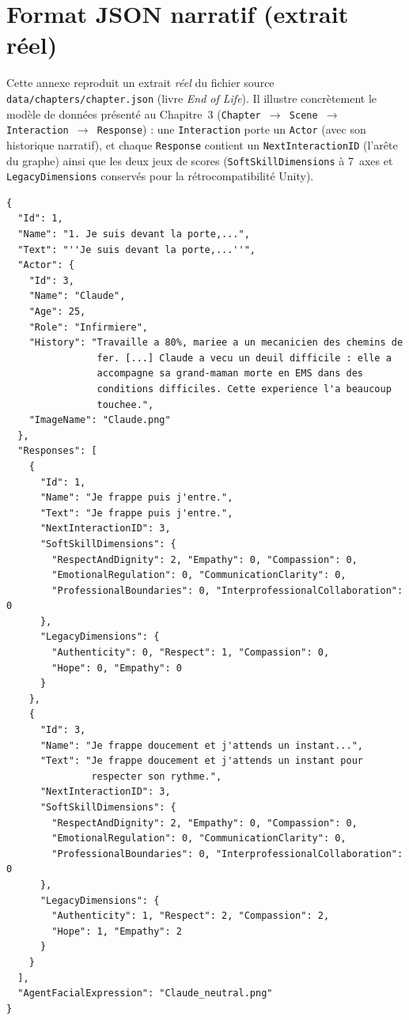 \chapter{Format JSON narratif (extrait réel)}
\label{annexe:json}
\renewcommand{\thepage}{\thechapter-\arabic{page}}

Cette annexe reproduit un extrait \emph{réel} du fichier source
\texttt{data/chapters/chapter.json} (livre \emph{End of Life}). Il illustre
concrètement le modèle de données présenté au Chapitre~3
(\texttt{Chapter $\rightarrow$ Scene $\rightarrow$ Interaction $\rightarrow$
Response}) : une \texttt{Interaction} porte un \texttt{Actor} (avec son
historique narratif), et chaque \texttt{Response} contient un
\texttt{NextInteractionID} (l'arête du graphe) ainsi que les deux jeux de
scores (\texttt{SoftSkillDimensions} à 7~axes et \texttt{LegacyDimensions}
conservés pour la rétrocompatibilité Unity).

\begin{lstlisting}[basicstyle=\ttfamily\scriptsize, frame=single, breaklines=true, xleftmargin=1em]
{
  "Id": 1,
  "Name": "1. Je suis devant la porte,...",
  "Text": "''Je suis devant la porte,...''",
  "Actor": {
    "Id": 3,
    "Name": "Claude",
    "Age": 25,
    "Role": "Infirmiere",
    "History": "Travaille a 80%, mariee a un mecanicien des chemins de
                fer. [...] Claude a vecu un deuil difficile : elle a
                accompagne sa grand-maman morte en EMS dans des
                conditions difficiles. Cette experience l'a beaucoup
                touchee.",
    "ImageName": "Claude.png"
  },
  "Responses": [
    {
      "Id": 1,
      "Name": "Je frappe puis j'entre.",
      "Text": "Je frappe puis j'entre.",
      "NextInteractionID": 3,
      "SoftSkillDimensions": {
        "RespectAndDignity": 2, "Empathy": 0, "Compassion": 0,
        "EmotionalRegulation": 0, "CommunicationClarity": 0,
        "ProfessionalBoundaries": 0, "InterprofessionalCollaboration": 0
      },
      "LegacyDimensions": {
        "Authenticity": 0, "Respect": 1, "Compassion": 0,
        "Hope": 0, "Empathy": 0
      }
    },
    {
      "Id": 3,
      "Name": "Je frappe doucement et j'attends un instant...",
      "Text": "Je frappe doucement et j'attends un instant pour
               respecter son rythme.",
      "NextInteractionID": 3,
      "SoftSkillDimensions": {
        "RespectAndDignity": 2, "Empathy": 0, "Compassion": 0,
        "EmotionalRegulation": 0, "CommunicationClarity": 0,
        "ProfessionalBoundaries": 0, "InterprofessionalCollaboration": 0
      },
      "LegacyDimensions": {
        "Authenticity": 1, "Respect": 2, "Compassion": 2,
        "Hope": 1, "Empathy": 2
      }
    }
  ],
  "AgentFacialExpression": "Claude_neutral.png"
}
\end{lstlisting}

